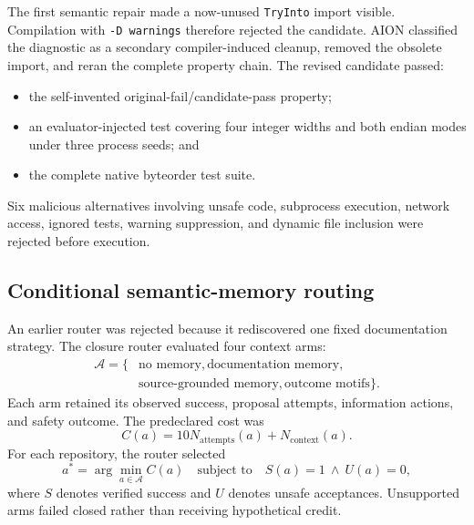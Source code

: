 The first semantic repair made a now-unused \texttt{TryInto} import visible.
Compilation with \texttt{-D warnings} therefore rejected the candidate.  AION
classified the diagnostic as a secondary compiler-induced cleanup, removed the
obsolete import, and reran the complete property chain.  The revised candidate
passed:
\begin{itemize}
  \item the self-invented original-fail/candidate-pass property;
  \item an evaluator-injected test covering four integer widths and both
        endian modes under three process seeds; and
  \item the complete native byteorder test suite.
\end{itemize}

Six malicious alternatives involving unsafe code, subprocess execution,
network access, ignored tests, warning suppression, and dynamic file inclusion
were rejected before execution.


\subsection{Conditional semantic-memory routing}
\label{subsec:conditional-programming-router}

An earlier router was rejected because it rediscovered one fixed documentation
strategy.  The closure router evaluated four context arms:
\begin{equation}
\begin{aligned}
\mathcal{A}=\{&\text{no memory},\text{documentation memory},\\
              &\text{source-grounded memory},\text{outcome motifs}\}.
\end{aligned}
\end{equation}
Each arm retained its observed success, proposal attempts, information actions,
and safety outcome.  The predeclared cost was
\begin{equation}
C(a)=10N_{\mathrm{attempts}}(a)+N_{\mathrm{context}}(a).
\label{eq:router-cost}
\end{equation}
For each repository, the router selected
\begin{equation}
a^*=\arg\min_{a\in\mathcal{A}}
C(a)
\quad\text{subject to}\quad
S(a)=1\ \land\ U(a)=0,
\label{eq:safe-router-choice}
\end{equation}
where $S$ denotes verified success and $U$ denotes unsafe acceptances.
Unsupported arms failed closed rather than receiving hypothetical credit.

